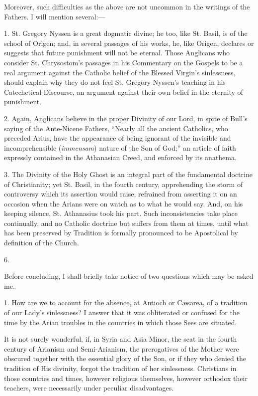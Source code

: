 Moreover, such difficulties as the above are not uncommon in the
writings of the Fathers. I will mention several:—


1. St. Gregory Nyssen is a great dogmatic divine; he too, like St.
Basil, is of the school of Origen; and, in several passages of his
works, he, like Origen, declares or suggests that future
punishment will not be eternal. Those Anglicans who consider St.
Chrysostom's passages in his Commentary on the Gospels to be a real
argument against the Catholic belief of the Blessed Virgin's sinlessness,
should explain why they do not feel St. Gregory Nyssen's teaching in his
Catechetical Discourse, an argument against their own belief in the
eternity of punishment.


2. Again, Anglicans believe in the proper Divinity of our Lord, in
spite of Bull's saying of the Ante-Nicene Fathers, ``Nearly all the
ancient Catholics, who preceded Arius, have the appearance of being
ignorant of the invisible and incomprehensible (\emph{immensam}) nature
of the Son of God;'' an article of faith expressly contained in the
Athanasian Creed, and enforced by its anathema.


3. The Divinity of the Holy Ghost is an integral part of the
fundamental doctrine of Christianity; yet St. Basil, in the fourth
century, apprehending the storm of controversy which its assertion would
raise, refrained from asserting it on an occasion when the Arians were
on watch as to what he would say. And, on his keeping silence, St.
Athanasius took his part. Such inconsistencies take place continually,
and no Catholic doctrine but suffers from them at times, until what has
been preserved by Tradition is formally pronounced to be Apostolical by
definition of the Church.


6.


Before concluding, I shall briefly take notice of two questions which
may be asked me.


1. How are we to account for the absence, at Antioch or
Cæsarea, of a tradition of our Lady's sinlessness? I answer that it was
obliterated or confused for the time by the Arian troubles in the
countries in which those Sees are situated.


It is not surely wonderful, if, in Syria and Asia Minor, the seat in
the fourth century of Arianism and Semi-Arianism, the prerogatives of
the Mother were obscured together with the essential glory of the Son,
or if they who denied the tradition of His divinity, forgot the
tradition of her sinlessness. Christians in those countries and times,
however religious themselves, however orthodox their teachers, were
necessarily under peculiar disadvantages.


